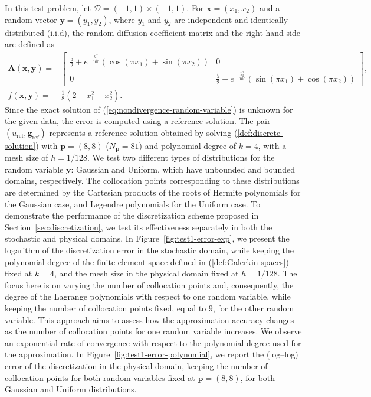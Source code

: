\documentclass[final,onefignum,onetabnum]{mousaviart}
\renewcommand\subsection[1]{%
	\refstepcounter{subsection}%
	\addcontentsline{toc}{subsection}{\protect\numberline{\thesection.\arabic{subsection}}#1}%
	\vspace{0.3ex plus 0.5ex minus 0.2ex}%
	\noindent
	{\normalfont\normalsize
		\thesection.\arabic{subsection}.\kern0.4em %
		\bfseries #1.}%
}
\begin{document}
		In this test problem, let $\mathcal{D} = (-1, 1) \times (-1,1)$. %
		For $\boldsymbol{x}=(x_1,x_2)$ and a random vector $\boldsymbol{y}=(y_1,y_2)$, where $y_1$ and $y_2$ are independent and identically distributed (i.i.d), the random diffusion coefficient matrix and the right-hand side are defined as
		\begin{align*}	
			\boldsymbol{A}(\boldsymbol{x}, \boldsymbol{y}) =&
			\begin{bmatrix}
				\frac{5}{2} + e^{ -\frac{y_1^2}{100}}  \left( \cos(\pi x_1) + \sin(\pi x_2) \right) 
				& 0
				\\
				0 &
				\frac{5}{2} + e^{-\frac{y_2^2}{100} }  \left( \sin(\pi x_1) + \cos(\pi x_2) \right)
			\end{bmatrix},
			\\
			f(\boldsymbol{x}, \boldsymbol{y}) =& \frac{1}{8}(2-x_1^2 -x_2^2).
		\end{align*}
		Since the exact solution of (\ref{eq:nondivergence-random-variable}) is unknown for the given data, the error is computed using a reference solution. The pair $(u_{\text{ref}}, \boldsymbol{g}_{\text{ref}})$ represents a reference solution obtained by solving (\ref{def:discrete-solution}) with ${\boldsymbol{p}}=(8,8)$ ($N_{\boldsymbol{p}}=81$) and polynomial degree of $k =4$, with a mesh size of $h = {1}/{128}$.
		We test two different types of distributions for the random variable $\boldsymbol{y}$: Gaussian and Uniform, which have unbounded and bounded domains, respectively. The collocation points corresponding to these distributions are determined by the Cartesian products of the roots of Hermite polynomials for the Gaussian case, and Legendre polynomials for the Uniform case. 
		To demonstrate the performance of the discretization scheme proposed in Section~\ref{sec:discretization}, we test its effectiveness separately in both the stochastic and physical domains. In Figure~\ref{fig:test1-error-exp}, we present the logarithm of the discretization error in the stochastic domain, while keeping the polynomial degree of the finite element space defined in (\ref{def:Galerkin-spaces}) fixed at $k=4$, and the mesh size in the physical domain fixed at $h={1}/{128}$. The focus here is on varying the number of collocation points and, consequently, the degree of the Lagrange polynomials with respect to one random variable, while keeping the number of collocation points fixed, equal to $9$, for the other random variable. This approach aims to assess how the approximation accuracy changes as the number of collocation points for one random variable increases. We observe an exponential rate of convergence with respect to the polynomial degree used for the approximation. In Figure~\ref{fig:test1-error-polynomial}, we report the (log–log) error of the discretization in the physical domain, keeping the number of collocation points for both random variables fixed at ${\boldsymbol{p}}=(8,8)$, for both Gaussian and Uniform distributions.
		
	
\end{document}
